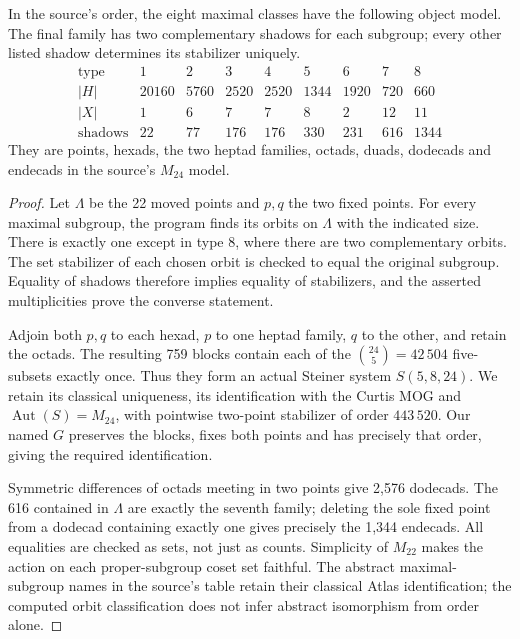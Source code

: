 \documentclass[11pt,a4paper]{article}
\newcommand{\Aut}{\operatorname{Aut}}\newcommand{\Stab}{\operatorname{Stab}}\newcommand{\cl}{\mathcal C}
\begin{document}
\begin{proposition}\label{prop:shadows}
In the source's order, the eight maximal classes have the following object model. The final family has two complementary shadows for each subgroup; every other listed shadow determines its stabilizer uniquely.
\[
\begin{array}{c|rrrrrrrr}
\text{type}&1&2&3&4&5&6&7&8\\\hline
|H|&20160&5760&2520&2520&1344&1920&720&660\\
|X|&1&6&7&7&8&2&12&11\\
\text{shadows}&22&77&176&176&330&231&616&1344
\end{array}
\]
They are points, hexads, the two heptad families, octads, duads, dodecads and endecads in the source's $M_{24}$ model.
\end{proposition}
\begin{proof}
Let $\Lambda$ be the 22 moved points and $p,q$ the two fixed points. For every maximal subgroup, the program finds its orbits on $\Lambda$ with the indicated size. There is exactly one except in type 8, where there are two complementary orbits. The set stabilizer of each chosen orbit is checked to equal the original subgroup. Equality of shadows therefore implies equality of stabilizers, and the asserted multiplicities prove the converse statement.

Adjoin both $p,q$ to each hexad, $p$ to one heptad family, $q$ to the other, and retain the octads. The resulting 759 blocks contain each of the $\binom{24}{5}=42\,504$ five-subsets exactly once. Thus they form an actual Steiner system $S(5,8,24)$. We retain its classical uniqueness, its identification with the Curtis MOG and $\Aut(S)=M_{24}$, with pointwise two-point stabilizer of order $443\,520$. Our named $G$ preserves the blocks, fixes both points and has precisely that order, giving the required identification.

Symmetric differences of octads meeting in two points give 2,576 dodecads. The 616 contained in $\Lambda$ are exactly the seventh family; deleting the sole fixed point from a dodecad containing exactly one gives precisely the 1,344 endecads. All equalities are checked as sets, not just as counts. Simplicity of $M_{22}$ makes the action on each proper-subgroup coset set faithful. The abstract maximal-subgroup names in the source's table retain their classical Atlas identification; the computed orbit classification does not infer abstract isomorphism from order alone.
\end{proof}
\end{document}
